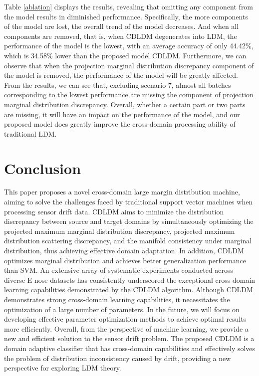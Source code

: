 \documentclass[a4paper]{cas-sc}
\begin{document}
Table \ref{ablation} displays the results, revealing that omitting any component from the model results in diminished performance.
Specifically, the more components of the model are lost, the overall trend of the model decreases. And when all components are removed, that is, when CDLDM degenerates into LDM, the performance of the model is the lowest, with an average accuracy of only 44.42\%, which is 34.58\% lower than the proposed model CDLDM. Furthermore, we can observe that when the projection marginal distribution discrepancy component of the model is removed, the performance of the model will be greatly affected. From the results, we can see that, excluding scenario 7, almost all batches corresponding to the lowest performance are missing the component of projection marginal distribution discrepancy. Overall, whether a certain part or two parts are missing, it will have an impact on the performance of the model, and our proposed model does greatly improve the cross-domain processing ability of traditional LDM.




\section{Conclusion}\label{Conclu}
This paper proposes a novel cross-domain large margin distribution machine, aiming to solve the challenges faced by traditional support vector machines when processing sensor drift data. CDLDM aims to minimize the distribution discrepancy between source and target domains by simultaneously optimizing the projected maximum marginal distribution discrepancy, projected maximum distribution scattering discrepancy, and the manifold consistency under marginal distribution, thus achieving effective domain adaptation. In addition, CDLDM optimizes marginal distribution and achieves better generalization performance than SVM.
An extensive array of systematic experiments conducted across diverse E-nose datasets has consistently underscored the exceptional cross-domain learning capabilities demonstrated by the CDLDM algorithm. Although CDLDM demonstrates strong cross-domain learning capabilities, it necessitates the optimization of a large number of parameters. In the future, we will focus on developing effective parameter optimization methods to achieve optimal results more efficiently.
Overall, from the perspective of machine learning, we provide a new and efficient solution to the sensor drift problem. The proposed CDLDM is a domain adaptive classifier that has cross-domain capabilities and effectively solves the problem of distribution inconsistency caused by drift, providing a new perspective for exploring LDM theory.
\end{document}
